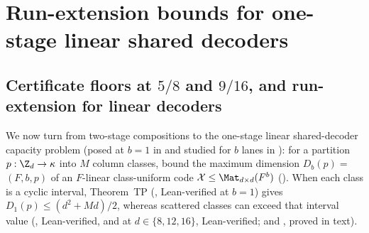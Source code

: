 \section{Run-extension bounds for one-stage linear shared decoders}\label{sec:linear-capacity}

\subsection{Certificate floors at \texorpdfstring{$5/8$}{5/8} and \texorpdfstring{$9/16$}{9/16}, and run-extension for linear decoders}\label{sec:run-extension}

We now turn from two-stage compositions to the one-stage linear shared-decoder capacity problem
(posed at $b = 1$ in \cite[Definition~6.3 and Problem~9.1(a)]{SeventeenthPaper2026} and studied for
$b$ lanes in \cite{SharedDecoders2026}): for a partition $p : \Z_d \to \kappa$ into $M$ column
classes, bound the maximum dimension $D_b(p) = {}$$(F, b, p)$ of an
$F$-linear class-uniform code $\mathcal{X} \le \Mat_{d\times d}(F^b)$
(). When each class is a cyclic interval, Theorem~TP
(\cite[Theorem~6.4]{SeventeenthPaper2026}, Lean-verified at $b = 1$) gives $D_1(p) \le (d^2 + M d)/2$,
whereas scattered classes can exceed that interval value
(\cite[Proposition~8.2]{SeventeenthPaper2026}, Lean-verified, and
\cite[Theorem~4.9]{ClassUniformMemo2026} at $d \in \{8, 12, 16\}$, Lean-verified;
\cite[Proposition~6.17 and Corollary~6.19]{SeventeenthPaper2026} and
\cite[Theorem~4.8 and Corollary~4.10]{ClassUniformMemo2026}, proved in text).

